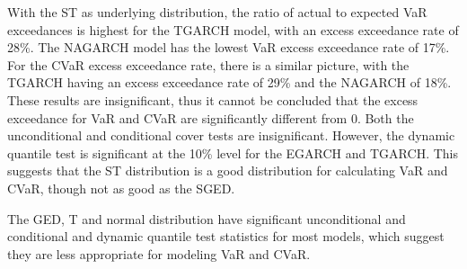 \documentclass[a4paper, nobind]{templates/ociamthesis}
\begin{document}
With the ST as underlying distribution, the ratio of actual to expected VaR exceedances is highest for the TGARCH model, with an excess exceedance rate of 28\%. The NAGARCH model has the lowest VaR excess exceedance rate of 17\%. For the CVaR excess exceedance rate, there is a similar picture, with the TGARCH having an excess exceedance rate of 29\% and the NAGARCH of 18\%. These results are insignificant, thus it cannot be concluded that the excess exceedance for VaR and CVaR are significantly different from 0. Both the unconditional and conditional cover tests are insignificant. However, the dynamic quantile test is significant at the 10\% level for the EGARCH and TGARCH. This suggests that the ST distribution is a good distribution for calculating VaR and CVaR, though not as good as the SGED.

The GED, T and normal distribution have significant unconditional and conditional and dynamic quantile test statistics for most models, which suggest they are less appropriate for modeling VaR and CVaR.

\newpage
\end{document}

